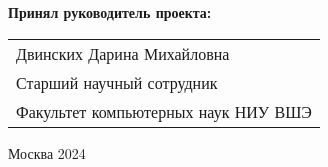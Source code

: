 \begin{titlepage}
\vspace{1em}
{\bf Принял руководитель проекта: \vspace{2mm}}

{
\begin{tabular}{l}
Двинских Дарина Михайловна \\
Старший научный сотрудник\\
Факультет компьютерных наук НИУ ВШЭ 
\end{tabular}}





\vspace{\fill}

\begin{center}
Москва 2024
\end{center}

\end{titlepage}